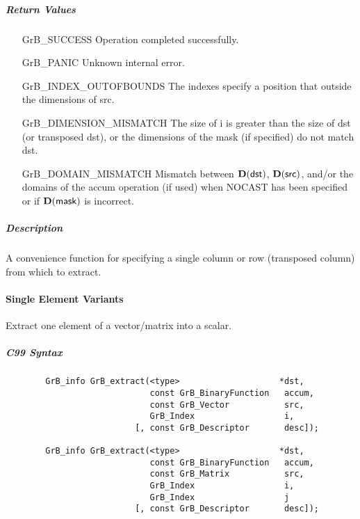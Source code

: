 \subparagraph{Return Values}

\begin{itemize}[leftmargin=2.1in]
\item[{\sf GrB\_SUCCESS}]             Operation completed successfully.
\item[{\sf GrB\_PANIC}]               Unknown internal error.
\item[{\sf GrB\_INDEX\_OUTOFBOUNDS}]  The indexes specify a position that outside the dimensions of src.
\item[{\sf GrB\_DIMENSION\_MISMATCH}] 
       The size of {\sf i} is greater than the size of {\sf dst} (or transposed {\sf dst}), 
       or the dimensions of the mask (if specified) do not match dst.
\item[{\sf GrB\_DOMAIN\_MISMATCH}]    Mismatch between $\bold{D}(\sf dst)$, 
                                      $\bold{D}({\sf src})$, and/or the domains of the 
                                      {\sf accum} operation (if used) when {\sf NOCAST} has
                                      been specified or if $\bold{D}(\sf mask)$ is incorrect.
\end{itemize}

\subparagraph{Description}

A convenience function for specifying a single column or row (transposed column) from which to extract.

\paragraph{Single Element Variants}

Extract one element of a vector/matrix into a scalar. 

\subparagraph{C99 Syntax}

\begin{verbatim}
        GrB_info GrB_extract(<type>                    *dst,
                             const GrB_BinaryFunction   accum,
                             const GrB_Vector           src,
                             GrB_Index                  i,
                          [, const GrB_Descriptor       desc]); 

        GrB_info GrB_extract(<type>                    *dst,
                             const GrB_BinaryFunction   accum,
                             const GrB_Matrix           src,
                             GrB_Index                  i,
                             GrB_Index                  j
                          [, const GrB_Descriptor       desc]); 

\end{verbatim}

